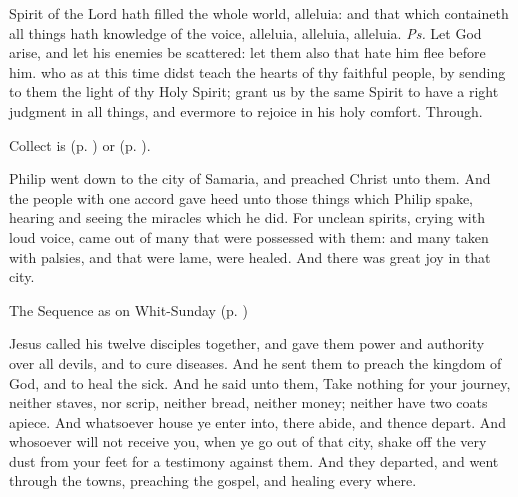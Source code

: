 
\introit
{} Spirit of the Lord hath filled the whole world, alleluia: and that which containeth all things hath knowledge of the voice, alleluia, alleluia, alleluia. \textit{Ps.} Let God arise, and let his enemies be scattered: let them also that hate him flee before him.
\collect
{} who as at this time didst teach the hearts of thy faithful people, by sending to them the light of thy Holy Spirit; grant us by the same Spirit to have a right judgment in all things, and evermore to rejoice in his holy comfort. Through.
\begin{rubric}
     Collect is  (p. \pageref{SPAgainst}) or  (p. \pageref{SPChiefBishop}).
\end{rubric}
 Philip went down to the city of Samaria, and preached Christ unto them. And the people with one accord gave heed unto those things which Philip spake, hearing and seeing the miracles which he did. For unclean spirits, crying with loud voice, came out of many that were possessed with them: and many taken with palsies, and that were lame, were healed. And there was great joy in that city.

\begin{rubric}
{The Sequence as on Whit-Sunday (p. \pageref{WhitSeq})}
\end{rubric}

 Jesus called his twelve disciples together, and gave them power and authority over all devils, and to cure diseases. And he sent them to preach the kingdom of God, and to heal the sick. And he said unto them, Take nothing for your journey, neither staves, nor scrip, neither bread, neither money; neither have two coats apiece. And whatsoever house ye enter into, there abide, and thence depart. And whosoever will not receive you, when ye go out of that city, shake off the very dust from your feet for a testimony against them. And they departed, and went through the towns, preaching the gospel, and healing every where.


